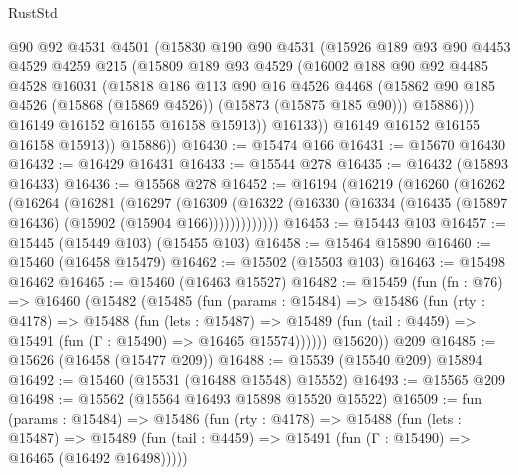 \begin{lexlean}{RustStd}
\begin{coremodule}
                @90
                @92
                @4531
                @4501
                (@15830
                  @190
                  @90
                  @4531
                  (@15926
                    @189
                    @93
                    @90
                    @4453
                    @4529
                    @4259
                    @215
                    (@15809
                      @189
                      @93
                      @4529
                      (@16002
                        @188
                        @90
                        @92
                        @4485
                        @4528
                        @16031
                        (@15818
                          @186
                          @113
                          @90
                          @16
                          @4526
                          @4468
                          (@15862 @90 @185 @4526 (@15868 (@15869 @4526)) (@15873 (@15875 @185 @90)))
                          @15886)))
                    @16149
                    @16152
                    @16155
                    @16158
                    @15913))
                @16133))
            @16149
            @16152
            @16155
            @16158
            @15913))
        @15886))
@16430 := @15474 @166
@16431 := @15670 @16430
@16432 := @16429 @16431
@16433 := @15544 @278
@16435 := @16432 (@15893 @16433)
@16436 := @15568 @278
@16452 := @16194
    (@16219
      (@16260
        (@16262
          (@16264
            (@16281
              (@16297
                (@16309
                  (@16322 (@16330 (@16334 (@16435 (@15897 @16436) (@15902 (@15904 @166)))))))))))))
@16453 := @15443 @103
@16457 := @15445 (@15449 @103) (@15455 @103)
@16458 := @15464 @15890
@16460 := @15460 (@16458 @15479)
@16462 := @15502 (@15503 @103)
@16463 := @15498 @16462
@16465 := @15460 (@16463 @15527)
@16482 := @15459
    (fun (fn : @76) =>
    @16460
      (@15482
        (@15485
          (fun (params : @15484) =>
          @15486
            (fun (rty : @4178) =>
            @15488
              (fun (lets : @15487) =>
              @15489 (fun (tail : @4459) => @15491 (fun (Γ : @15490) => @16465 @15574))))))
        @15620))
    @209
@16485 := @15626 (@16458 (@15477 @209))
@16488 := @15539 (@15540 @209) @15894
@16492 := @15460 (@15531 (@16488 @15548) @15552)
@16493 := @15565 @209
@16498 := @15562 (@15564 @16493 @15898 @15520 @15522)
@16509 := fun (params : @15484) =>
  @15486
    (fun (rty : @4178) =>
    @15488
      (fun (lets : @15487) =>
      @15489 (fun (tail : @4459) => @15491 (fun (Γ : @15490) => @16465 (@16492 @16498)))))

\end{coremodule}
\end{lexlean}
